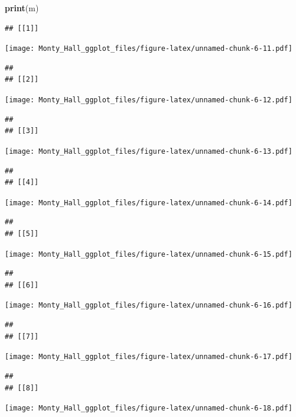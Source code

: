 \documentclass[
]{article}
\newenvironment{Shaded}{\begin{snugshade}}{\end{snugshade}}
\newcommand{\KeywordTok}[1]{\textcolor[rgb]{0.13,0.29,0.53}{\textbf{#1}}}
\newcommand{\NormalTok}[1]{#1}
\begin{document}
\begin{Shaded}
\begin{Highlighting}[]
\KeywordTok{print}\NormalTok{(m)}
\end{Highlighting}
\end{Shaded}

\begin{verbatim}
## [[1]]
\end{verbatim}

\texttt{[image: Monty\_Hall\_ggplot\_files/figure-latex/unnamed-chunk-6-11.pdf]}

\begin{verbatim}
## 
## [[2]]
\end{verbatim}

\texttt{[image: Monty\_Hall\_ggplot\_files/figure-latex/unnamed-chunk-6-12.pdf]}

\begin{verbatim}
## 
## [[3]]
\end{verbatim}

\texttt{[image: Monty\_Hall\_ggplot\_files/figure-latex/unnamed-chunk-6-13.pdf]}

\begin{verbatim}
## 
## [[4]]
\end{verbatim}

\texttt{[image: Monty\_Hall\_ggplot\_files/figure-latex/unnamed-chunk-6-14.pdf]}

\begin{verbatim}
## 
## [[5]]
\end{verbatim}

\texttt{[image: Monty\_Hall\_ggplot\_files/figure-latex/unnamed-chunk-6-15.pdf]}

\begin{verbatim}
## 
## [[6]]
\end{verbatim}

\texttt{[image: Monty\_Hall\_ggplot\_files/figure-latex/unnamed-chunk-6-16.pdf]}

\begin{verbatim}
## 
## [[7]]
\end{verbatim}

\texttt{[image: Monty\_Hall\_ggplot\_files/figure-latex/unnamed-chunk-6-17.pdf]}

\begin{verbatim}
## 
## [[8]]
\end{verbatim}

\texttt{[image: Monty\_Hall\_ggplot\_files/figure-latex/unnamed-chunk-6-18.pdf]}
\end{document}
